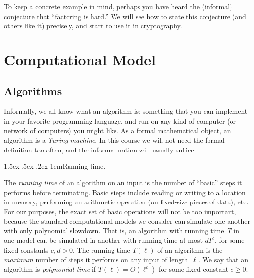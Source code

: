\documentclass[11pt]{article}
\begin{document}
To keep a concrete example in mind, perhaps you have heard the
(informal) conjecture that ``factoring is hard.''  We will see how to
state this conjecture (and others like it) precisely, and start to use
it in cryptography.

\section{Computational Model}
\label{sec:computational-model}

\subsection{Algorithms}
\label{sec:algorithms}

Informally, we all know what an algorithm is: something that you can implement in your favorite programming language, and run on any kind of computer (or network of computers) you might like.
As a formal mathematical object, an algorithm is a \emph{Turing machine}.
In this course we will not need the formal definition too often, and the informal notion will usually suffice.

\begingroup
\makeatletter
\renewcommand{\paragraph}{\@startsection{paragraph}{4}{\z@}%
  {1.5ex \@plus .5ex \@minus .2ex}{-1em}{\normalfont\normalsize\bfseries}}
\makeatother
\paragraph{Running time.}

The \emph{running time} of an algorithm on an input is the number of ``basic'' steps it performs before terminating.
Basic steps include reading or writing to a location in memory, performing an arithmetic operation (on fixed-size pieces of data), etc.
For our purposes, the exact set of basic operations will not be too important, because the standard computational models we consider can simulate one another with only polynomial slowdown.
That is, an algorithm with running time~$T$ in one model can be simulated in another with running time at most $dT^{c}$, for some fixed constants $c,d>0$.
The running time $T(\ell)$ of an algorithm is the \emph{maximum} number of steps it performs on any input of length~$\ell$.
We say that an algorithm is \emph{polynomial-time} if $T(\ell)=O(\ell^{c})$ for some fixed constant $c\geq0$.
\end{document}
